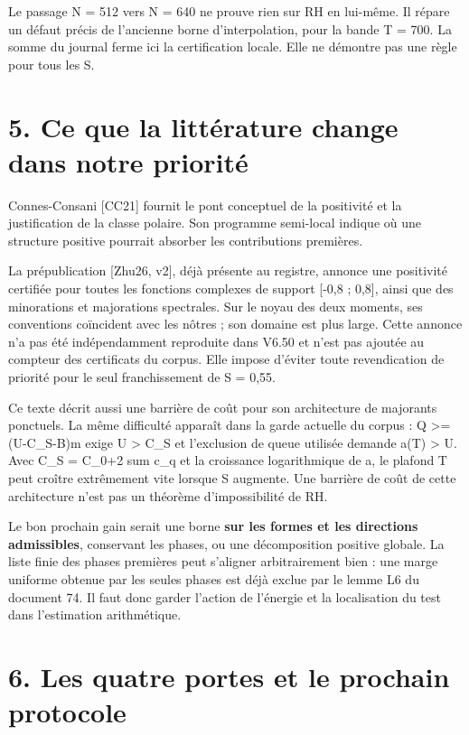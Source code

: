 \documentclass[
  10pt,
  a4paper,
]{article}
\begin{document}
Le passage N = 512 vers N = 640 ne prouve rien sur RH en lui-même. Il
répare un défaut précis de l'ancienne borne d'interpolation, pour la
bande T = 700. La somme du journal ferme ici la certification locale.
Elle ne démontre pas une règle pour tous les S.

\hypertarget{ce-que-la-littuxe9rature-change-dans-notre-priorituxe9}{%
\section{5. Ce que la littérature change dans notre
priorité}\label{ce-que-la-littuxe9rature-change-dans-notre-priorituxe9}}

Connes-Consani {[}CC21{]} fournit le pont conceptuel de la positivité et
la justification de la classe polaire. Son programme semi-local indique
où une structure positive pourrait absorber les contributions premières.

La prépublication {[}Zhu26, v2{]}, déjà présente au registre, annonce
une positivité certifiée pour toutes les fonctions complexes de support
{[}-0,8 ; 0,8{]}, ainsi que des minorations et majorations spectrales.
Sur le noyau des deux moments, ses conventions coïncident avec les
nôtres ; son domaine est plus large. Cette annonce n'a pas été
indépendamment reproduite dans V6.50 et n'est pas ajoutée au compteur
des certificats du corpus. Elle impose d'éviter toute revendication de
priorité pour le seul franchissement de S = 0,55.

Ce texte décrit aussi une barrière de coût pour son architecture de
majorants ponctuels. La même difficulté apparaît dans la garde actuelle
du corpus : Q \textgreater= (U-C\_S-\textbar\textbar B\textbar\textbar)m
exige U \textgreater{} C\_S et l'exclusion de queue utilisée demande
a(T) \textgreater{} U. Avec C\_S = C\_0+2 sum c\_q et la croissance
logarithmique de a, le plafond T peut croître extrêmement vite lorsque S
augmente. Une barrière de coût de cette architecture n'est pas un
théorème d'impossibilité de RH.

Le bon prochain gain serait une borne \textbf{sur les formes et les
directions admissibles}, conservant les phases, ou une décomposition
positive globale. La liste finie des phases premières peut s'aligner
arbitrairement bien : une marge uniforme obtenue par les seules phases
est déjà exclue par le lemme L6 du document 74. Il faut donc garder
l'action de l'énergie et la localisation du test dans l'estimation
arithmétique.

\hypertarget{les-quatre-portes-et-le-prochain-protocole}{%
\section{6. Les quatre portes et le prochain
protocole}\label{les-quatre-portes-et-le-prochain-protocole}}
\end{document}
